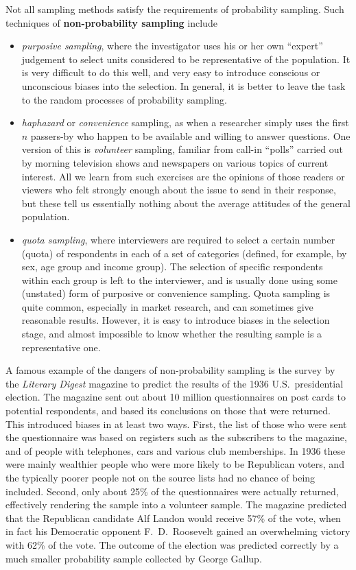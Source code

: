 \documentclass[11pt,a4paper,openany]{book}
\begin{document}
Not all sampling methods satisfy the requirements of probability
sampling. Such techniques of \textbf{non-probability sampling} include

\begin{itemize}
\item
  \emph{purposive sampling}, where the investigator uses his or her own
  ``expert'' judgement to select units considered to be representative
  of the population. It is very difficult to do this well, and very easy
  to introduce conscious or unconscious biases into the selection. In
  general, it is better to leave the task to the random processes of
  probability sampling.
\item
  \emph{haphazard} or \emph{convenience} sampling, as when a researcher
  simply uses the first \(n\) passers-by who happen to be available and
  willing to answer questions. One version of this is \emph{volunteer}
  sampling, familiar from call-in ``polls'' carried out by morning
  television shows and newspapers on various topics of current interest.
  All we learn from such exercises are the opinions of those readers or
  viewers who felt strongly enough about the issue to send in their
  response, but these tell us essentially nothing about the average
  attitudes of the general population.
\item
  \emph{quota sampling}, where interviewers are required to select a
  certain number (quota) of respondents in each of a set of categories
  (defined, for example, by sex, age group and income group). The
  selection of specific respondents within each group is left to the
  interviewer, and is usually done using some (unstated) form of
  purposive or convenience sampling. Quota sampling is quite common,
  especially in market research, and can sometimes give reasonable
  results. However, it is easy to introduce biases in the selection
  stage, and almost impossible to know whether the resulting sample is a
  representative one.
\end{itemize}

A famous example of the dangers of non-probability sampling is the
survey by the \emph{Literary Digest} magazine to predict the results of
the 1936 U.S.~presidential election. The magazine sent out about 10
million questionnaires on post cards to potential respondents, and based
its conclusions on those that were returned. This introduced biases in
at least two ways. First, the list of those who were sent the
questionnaire was based on registers such as the subscribers to the
magazine, and of people with telephones, cars and various club
memberships. In 1936 these were mainly wealthier people who were more
likely to be Republican voters, and the typically poorer people not on
the source lists had no chance of being included. Second, only about
25\% of the questionnaires were actually returned, effectively rendering
the sample into a volunteer sample. The magazine predicted that the
Republican candidate Alf Landon would receive 57\% of the vote, when in
fact his Democratic opponent F.~D.~Roosevelt gained an overwhelming
victory with 62\% of the vote. The outcome of the election was predicted
correctly by a much smaller probability sample collected by George
Gallup.
\end{document}
